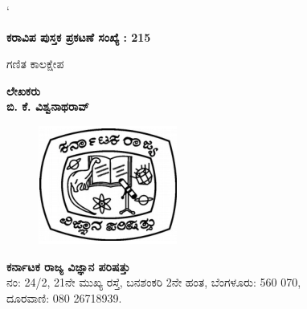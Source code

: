 
`~

\hfill{\bfseries ಕರಾವಿಪ ಪುಸ್ತಕ ಪ್ರಕಟಣೆ ಸಂಖ್ಯೆ : {\rm 215}}

\vfill 

\thispagestyle{empty}
\begin{center}
{\fontsize{30}{32}\selectfont ಗಣಿತ ಕಾಲಕ್ಷೇಪ}
\vfill


{\Large\bfseries ಲೇಖಕರು}\\[4pt]
{\LARGE\bfseries ಬಿ. ಕೆ. ವಿಶ್ವನಾಥರಾವ್}\\[4pt]
\vfill

\begin{figure}[H]
\centering
\includegraphics[scale=.7]{images/logo.eps}
\end{figure}

{\Large\bfseries ಕರ್ನಾಟಕ ರಾಜ್ಯ ವಿಜ್ಞಾನ ಪರಿಷತ್ತು}\\
ನಂ: {\rm 24/2}, {\rm 21}ನೇ ಮುಖ್ಯ ರಸ್ತೆ, ಬನಶಂಕರಿ {\rm 2}ನೇ ಹಂತ, ಬೆಂಗಳೂರು: {\rm 560 070},\\
ದೂರವಾಣಿ: {\rm 080 26718939.}


\end{center}
